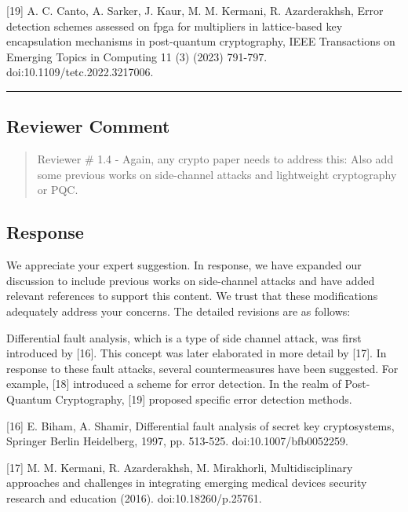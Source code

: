 [19] A. C. Canto, A. Sarker, J. Kaur, M. M. Kermani, R. Azarderakhsh, Error detection schemes assessed on fpga for multipliers in lattice-based key encapsulation mechanisms in post-quantum cryptography, IEEE Transactions on Emerging Topics in Computing 11 (3) (2023) 791-797. doi:10.1109/tetc.2022.3217006.

\color{black}

\noindent\rule{\linewidth}{2.0pt}

\subsection{Reviewer Comment}
\begin{mdframed}
	\begin{quote}
		Reviewer \# 1.4 - Again, any crypto paper needs to address this: Also add some previous works on side-channel attacks and lightweight cryptography or PQC.
	\end{quote}
\end{mdframed}

\subsection{Response}

We appreciate your expert suggestion. In response, we have expanded our discussion to include previous works on side-channel attacks and have added relevant references to support this content. We trust that these modifications adequately address your concerns. The detailed revisions are as follows:

\color{blue}

Differential fault analysis, which is a type of side channel attack, was first introduced by [16]. This concept was later elaborated in more detail by [17]. In response to these fault attacks, several countermeasures have been suggested. For example, [18] introduced a scheme for error detection. In the realm of Post-Quantum Cryptography, [19] proposed specific error detection methods.

[16] E. Biham, A. Shamir, Differential fault analysis of secret key cryptosystems, Springer Berlin Heidelberg, 1997, pp. 513-525. doi:10.1007/bfb0052259.


[17] M. M. Kermani, R. Azarderakhsh, M. Mirakhorli, Multidisciplinary approaches and challenges in integrating emerging medical devices security research and education (2016). \linebreak doi:10.18260/p.25761.


